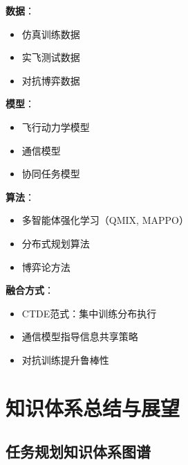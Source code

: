 \documentclass[12pt,a4paper]{ctexart}
\begin{document}
\begin{applicationbox}[多无人机协同规划中的三元融合]
\textbf{数据}：
\begin{itemize}
    \item 仿真训练数据
    \item 实飞测试数据
    \item 对抗博弈数据
\end{itemize}

\textbf{模型}：
\begin{itemize}
    \item 飞行动力学模型
    \item 通信模型
    \item 协同任务模型
\end{itemize}

\textbf{算法}：
\begin{itemize}
    \item 多智能体强化学习（QMIX, MAPPO）
    \item 分布式规划算法
    \item 博弈论方法
\end{itemize}

\textbf{融合方式}：
\begin{itemize}
    \item CTDE范式：集中训练分布执行
    \item 通信模型指导信息共享策略
    \item 对抗训练提升鲁棒性
\end{itemize}
\end{applicationbox}

\section{知识体系总结与展望}

\subsection{任务规划知识体系图谱}
\end{document}
